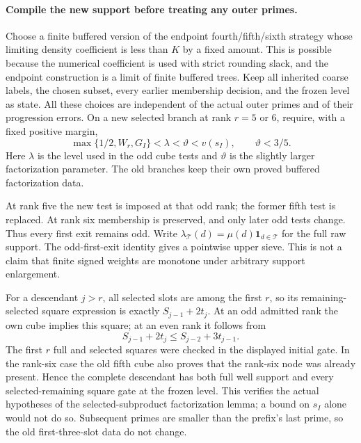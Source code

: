 \paragraph{Compile the new support before treating any outer primes.}
Choose a finite buffered version of the endpoint fourth/fifth/sixth
strategy whose limiting density coefficient is less than $K$ by a fixed
amount. This is possible because the numerical coefficient is used
with strict rounding slack, and the endpoint construction is a limit
of finite buffered trees. Keep all inherited coarse labels, the chosen
subset, every earlier membership decision, and the frozen level as
state. All these choices are independent of the actual outer primes
and of their progression errors. On a new selected branch at rank
$r=5$ or $6$, require, with a fixed positive margin,
\[
 \max\{1/2,W_r,G_I\}<\lambda<\vartheta<v(s_I),
 \qquad \vartheta<3/5.
\]
Here $\lambda$ is the level used in the odd cube tests and
$\vartheta$ is the slightly larger factorization parameter. The old
branches keep their own proved buffered factorization data.

At rank five the new test is imposed at that odd rank; the former
fifth test is replaced. At rank six membership is preserved, and only
later odd tests change. Thus every first exit remains odd. Write
$\lambda_{\mathcal T}(d)=\mu(d)\mathbf1_{d\in\mathcal T}$ for the
full raw support. The odd-first-exit identity gives a pointwise upper
sieve. This is not a claim that finite signed weights are monotone
under arbitrary support enlargement.

For a descendant $j>r$, all selected slots are among the first $r$,
so its remaining-selected square expression is exactly
$S_{j-1}+2t_j$. At an odd admitted rank the own cube implies this
square; at an even rank it follows from
\[
 S_{j-1}+2t_j\le S_{j-2}+3t_{j-1}.
\]
The first $r$ full and selected squares were checked in the displayed
initial gate. In the rank-six case the old fifth cube also proves that
the rank-six node was already present. Hence the complete descendant
has both full well support and every selected-remaining square gate
at the frozen level. This verifies the actual hypotheses of the
selected-subproduct factorization lemma; a bound on $s_I$ alone
would not do so. Subsequent primes are smaller than the prefix's last
prime, so the old first-three-slot data do not change.

